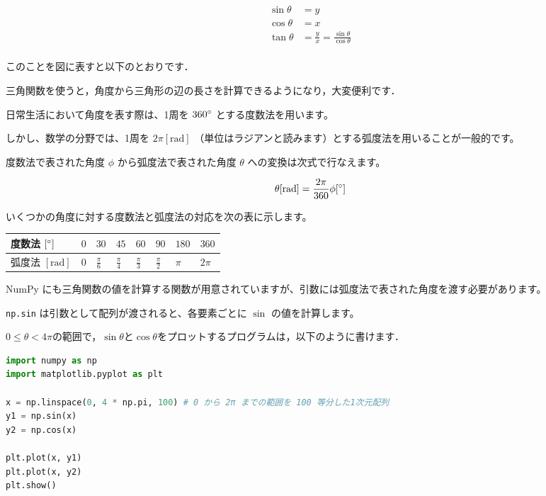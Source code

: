 \[
\begin{aligned}
\sin{\theta} &= y \\
\cos{\theta} &= x \\
\tan{\theta} &= \frac{y}{x} = \frac{\sin{\theta}}{\cos{\theta}} \\
\end{aligned}
\]


このことを図に表すと以下のとおりです．




三角関数を使うと，角度から三角形の辺の長さを計算できるようになり，大変便利です．


日常生活において角度を表す際は、1周を $360 ^\circ$ とする度数法を用います。

しかし、数学の分野では、1周を $2\pi [\mathrm{rad}]$ （単位はラジアンと読みます）とする弧度法を用いることが一般的です。

度数法で表された角度 $\phi$ から弧度法で表された角度 $\theta$ への変換は次式で行なえます。

\[
\theta [\mathrm{rad}] = \frac{2\pi}{360} \phi [^\circ]
\]


いくつかの角度に対する度数法と弧度法の対応を次の表に示します。

\begin{center}
\begin{tabular}{|l|l|l|l|l|l|l|l|}
\hline
度数法 $[^\circ]$ & $0$ & $30$ & $45$ & $60$ & $90$ & $180$ & $360$ \\
\hline
弧度法 $[\mathrm{rad}]$ & $0$ & $\frac{\pi}{6}$ & $\frac{\pi}{4}$ & $\frac{\pi}{3}$ & $\frac{\pi}{2}$ & $\pi$ & $2\pi$ \\
\hline
\end{tabular}
\end{center}


NumPy にも三角関数の値を計算する関数が用意されていますが、引数には弧度法で表された角度を渡す必要があります。

\texttt{np.sin} は引数として配列が渡されると、各要素ごとに $\sin$ の値を計算します。

$0 \le \theta < 4\pi$の範囲で，$\sin \theta$と$\cos \theta$をプロットするプログラムは，以下のように書けます．


\begin{lstlisting}[style=codecell,language=Python]
import numpy as np
import matplotlib.pyplot as plt

x = np.linspace(0, 4 * np.pi, 100) # 0 から 2π までの範囲を 100 等分した1次元配列
y1 = np.sin(x)
y2 = np.cos(x)

plt.plot(x, y1)
plt.plot(x, y2)
plt.show()
\end{lstlisting}

